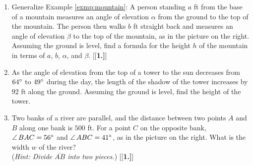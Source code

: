 {\begin{enumerate}[\bfseries 1.]
 \item Generalize Example \ref{exmp:mountain}: A person standing $a$ ft from the base of a
 mountain measures an angle of elevation $\alpha$ from the ground to the top of the mountain.
 The person then walks $b$ ft straight back and measures an angle of elevation $\beta$ to the top
 of the mountain, as in the picture on the right. Assuming the ground is level, find a formula for
 the height $h$ of the mountain in terms of $a$, $b$, $\alpha$, and $\beta$.
[{[\bfseries 1.]}]
 \item As the angle of elevation from the top of a tower to the sun decreases from $64^\circ$ to
 $49^\circ$ during the day, the length of the shadow of the tower increases by $92$ ft along the
 ground. Assuming the ground is level, find the height of the tower.\vspace{2mm}
 \item Two banks of a river are parallel, and the distance between two points $A$ and $B$ along
 one bank is $500$ ft. For a point $C$ on the opposite bank, $\angle\,BAC = 56^\circ$ and
 $\angle\,ABC = 41^\circ$, as in the picture on the right. What is the width $w$ of the
 river?\\(\emph{Hint: Divide $\overline{AB}$ into two pieces.})\vspace{5mm}
[{[\bfseries 1.]}]
\end{enumerate}}

